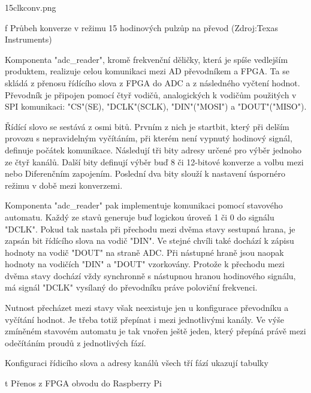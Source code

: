\medskip {}
\picw=13cm \cinspic 15clkconv.png
\caption/f Průbeh konverze v režimu 15 hodinových pulzůp na převod (Zdroj:Texas Instruments)
\medskip

Komponenta "adc_reader", kromě frekvenční děličky, která je spíše vedlejším produktem, realizuje celou komunikaci mezi AD převodníkem a FPGA. Ta se skládá z přenosu řídícího slova z FPGA do ADC a z následného vyčtení hodnot. Převodník je připojen pomocí čtyř vodičů, analogických k vodičům použitých v SPI komunikaci: "CS"(SE), "DCLK"(SCLK), "DIN"("MOSI") a "DOUT"("MISO").

Řídící slovo se sestává z osmi bitů. Prvním z nich je startbit, který při delším provozu s nepravidelným vyčítáním, při kterém není  vypnutý hodinový signál, definuje počátek komunikace. Následují tři bity adresy určené pro výběr jednoho ze čtyř kanálů. Další bity definují výběr buď 8 či 12-bitové konverze a volbu mezi   nebo Diferenčním zapojením. Poslední dva bity slouží k nastavení úspornéro režimu v době mezi konverzemi.  

Komponenta "adc_reader" pak implementuje komunikaci pomocí stavového automatu. Každý ze stavů generuje buď logickou úroveň 1 či 0 do signálu "DCLK". Pokud tak nastala při přechodu mezi dvěma stavy sestupná hrana,   je zapsán bit řídícího slova na vodič "DIN". Ve stejné chvíli také dochází k zápisu hodnoty na vodič "DOUT" na straně ADC. Při nástupné hraně jsou naopak hodnoty na vodičích "DIN" a "DOUT" vzorkovány. Protože k přechodu mezi dvěma stavy dochází vždy synchronně s nástupnou hranou hodinového signálu, má signál "DCLK" vysílaný do převodníku práve poloviční frekvenci.

Nutnost přecházet mezi stavy však neexistuje jen u konfigurace převodníku a vyčítání hodnot. Je třeba totiž přepínat i mezi jednotlivými kanály. Ve výše zmíněném stavovém automatu je tak vnořen ještě jeden, který přepíná právě mezi odečítáním proudů z jednotlivých fází.

Konfiguraci řídicího slova a adresy kanálů všech tří fází ukazují tabulky

 \medskip {}
\caption/t Přenos z FPGA obvodu do Raspberry Pi 
\medskip 

